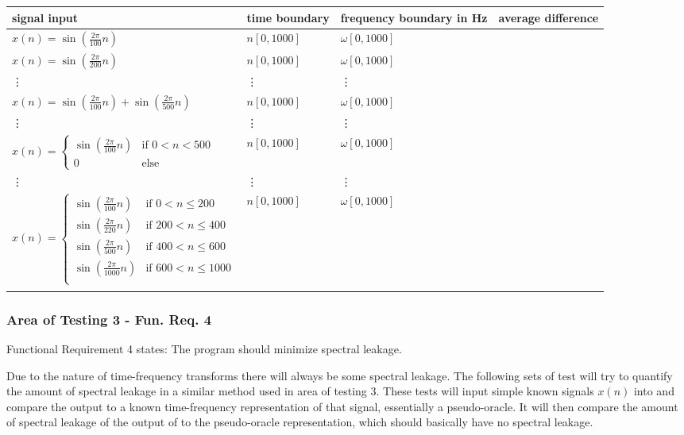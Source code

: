\documentclass[12pt, titlepage]{article}
\begin{document}
\begin{table}[!h]
  \caption{Input Signals for area of testing 2, assume a sampling period of 0.1 seconds. } \label{Tblreq3}
  \renewcommand{\arraystretch}{1.2}
\noindent \begin{longtable*}{l m{2cm} m{2cm} c} 
  \toprule
  \textbf{signal input} & \textbf{time boundary} & \textbf{frequency boundary in Hz} & \textbf{average difference}\\
  \midrule 
  $x(n) = \sin (\frac{2 \pi}{100} n)$ & $n[0,1000]$ & $\omega[0, 1000]$ &  \\
  $x(n) = \sin (\frac{2 \pi}{200}  n)$ & $n[0,1000]$ & $\omega[0, 1000]$ &  \\
  \vdots & \vdots & \vdots & \\
  $x(n) = \sin (\frac{2 \pi}{100} n) + \sin (\frac{2 \pi}{500}  n)$ & $n[0,1000]$ & $\omega[0, 1000]$ &  \\
  \vdots & \vdots & \vdots & \\
  $x(n) = \begin{cases} 
  \sin (\frac{2 \pi}{100}  n) & \text{if } 0 < n < 500 \\
  0 &\text{else}
    \end{cases}$   & $n[0,1000]$ & $\omega[0, 1000]$ & \\
  \vdots & \vdots & \vdots & \\
  
  $x(n) = \begin{cases} 
  \sin (\frac{2 \pi}{100}  n) & \text{if } 0 < n \leq 200 \\
  \sin (\frac{2 \pi}{220}  n)&\text{if }  200 < n \leq 400 \\
  \sin (\frac{2 \pi}{500}  n)&\text{if }  400 < n \leq 600 \\
   \sin (\frac{2 \pi}{1000}  n)&\text{if }  600 < n \leq 1000 \\
    \end{cases}$   & $n[0,1000]$ & $\omega[0, 1000]$ & \\
\bottomrule \\
\end{longtable*}
\end{table}


\subsubsection{Area of Testing 3 - Fun. Req. 4} \label{test_req4}
Functional Requirement 4 states: The program should minimize spectral leakage. 

Due to the nature of time-frequency transforms there will always be some spectral leakage. The following sets of test will try to quantify the amount of spectral leakage in a similar method used in area of testing 3. These tests will input simple known signals $x(n)$ into \progname{} and compare the output to a known time-frequency representation of that signal, essentially a pseudo-oracle. It will then compare the amount of spectral leakage of the output of \progname{} to the pseudo-oracle representation, which should basically have no spectral leakage.
\end{document}
